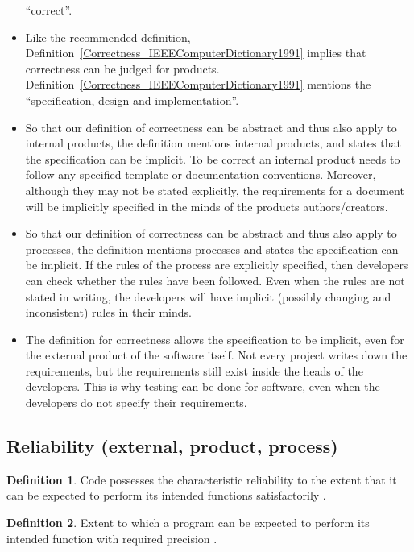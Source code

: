 \documentclass[letterpaper, cleveref]{lipics-v2019}
\newcommand{\authornote}[3]{\textcolor{#1}{[#3 ---#2]}}
\newcommand{\authornote}[3]{}
\newcommand{\oo}[1]{\authornote{magenta}{OO}{#1}} %
\theoremstyle{definition}
\newtheorem{defn}{Definition}
\begin{document}
\begin{itemize}
  ``correct''.
  \item Like the recommended definition,
  Definition~\ref{Correctness_IEEEComputerDictionary1991} implies that
  correctness can be judged for products.
  Definition~\ref{Correctness_IEEEComputerDictionary1991} mentions the
  ``specification, design and implementation''.
  \item So that our definition of correctness can be abstract and thus also
  apply to internal products, the definition mentions internal products, and
  states that the specification can be implicit.  To be correct an internal
  product needs to follow any specified template or documentation conventions.
  Moreover, although they may not be stated explicitly, the requirements for a
  document will be implicitly specified in the minds of the products
  authors/creators.
  \item So that our definition of correctness can be abstract and thus also
  apply to processes, the definition mentions processes and states the
  specification can be implicit.  If the rules of the process are explicitly
  specified, then developers can check whether the rules have been followed.
  Even when the rules are not stated in writing, the developers will have
  implicit (possibly changing and inconsistent) rules in their minds.
  \item The definition for correctness allows the specification to be implicit,
  even for the external product of the software itself.  Not every project
  writes down the requirements, but the requirements still exist inside the
  heads of the developers.  This is why testing can be done for software, even
  when the developers do not specify their requirements.
\end{itemize}


\subsection{Reliability (external, product, process)} %

\begin{defn}
  Code possesses the characteristic reliability to the extent that it can be
  expected to perform its intended functions satisfactorily
  \citep{boehm1976quantitative}.
\end{defn}

\begin{defn}
  Extent to which a program can be expected to perform its intended function
  with required precision \citep{McCallEtAl1977}.
\end{defn}
\end{document}
